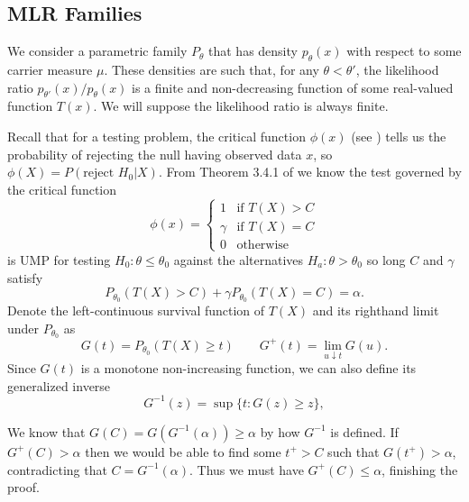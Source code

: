\documentclass{article}
\begin{document}
\begin{appendix}
\subsection{MLR Families}

We consider a parametric family $P_{\theta}$ that has density $p_{\theta}(x)$ with respect to some carrier measure $\mu$. These densities are such that, for any $\theta < \theta'$, the likelihood ratio $p_{\theta'}(x)/p_{\theta}(x)$ is a finite and non-decreasing function of some real-valued function $T(x)$. We will suppose the likelihood ratio is always finite. 


Recall that for a testing problem, the critical function $\phi(x)$ (see \cite[Section 3.1]{Lehmann}) tells us the probability of rejecting the null having observed data $x$, so $\phi(X) = P(\text{reject } H_0 | X)$. From Theorem 3.4.1 of \cite{Lehmann} we know the test governed by the critical function 
\begin{equation}
    \label{eq:mlr_test}
    \phi(x) = \begin{cases}
        1 &\text{if } T(X) > C  \\
        \gamma &\text{if } T(X) = C  \\
        0 & \text{otherwise }
    \end{cases}
\end{equation}
is UMP for testing $H_0 : \theta \leq \theta_0$ against the alternatives $H_a : \theta > \theta_0 $ so long $C$ and $\gamma$ satisfy
\begin{equation}
    \label{eq:constraint}
    P_{\theta_0}(T(X) > C) + \gamma P_{\theta_0}(T(X) = C) = \alpha.
\end{equation}
Denote the left-continuous survival function of $T(X)$ and its righthand limit under $P_{\theta_0}$ as
\begin{equation*}
    G(t) = P_{\theta_0}(T(X) \geq t) \qquad G^+(t) = \lim_{u \downarrow t} G(u).
\end{equation*}
Since $G(t)$ is a monotone non-increasing function, we can also define its generalized inverse 
\begin{equation*}
    G^{-1}(z) = \sup \{ t : G(z) \geq z\},
\end{equation*}

    
    
We know that $G(C) = G(G^{-1}(\alpha)) \geq \alpha$ by how $G^{-1}$ is defined. If $G^+(C) > \alpha$ then we would be able to find some $t^+ > C$ such that $G(t^+) > \alpha$, contradicting that $C = G^{-1}(\alpha)$. Thus we must have $G^+(C) \leq \alpha$, finishing the proof. 


\end{appendix}
\end{document}
